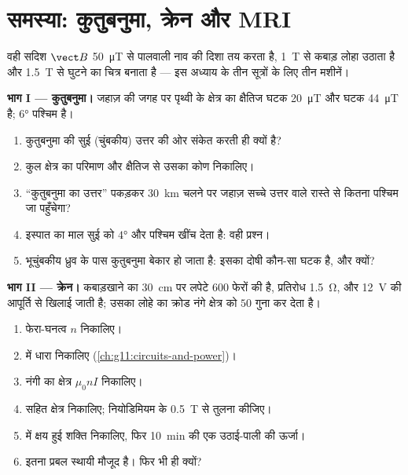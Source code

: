 \section{समस्या: कुतुबनुमा, क्रेन और MRI}

\begin{problem}
\label{pb:g11:magnetic-fields:1}
वही सदिश $\vect B$ \qty{50}{\micro T} से पालवाली नाव की दिशा तय करता है, \qty{1}{T} से
कबाड़ लोहा उठाता है और \qty{1.5}{T} से घुटने का चित्र बनाता है --- इस अध्याय के
तीन सूत्रों के लिए तीन मशीनें।

\medskip
\noindent\textbf{भाग I --- कुतुबनुमा।}
जहाज़ की जगह पर पृथ्वी के क्षेत्र का क्षैतिज घटक \qty{20}{\micro T} और
 घटक \qty{44}{\micro T} है;  $\ang{6}$ पश्चिम है।
\begin{enumerate}
  \item कुतुबनुमा की सुई (चुंबकीय) उत्तर की ओर संकेत करती ही क्यों है?
  \item कुल क्षेत्र का परिमाण और क्षैतिज से उसका कोण निकालिए।
  \item ``कुतुबनुमा का उत्तर'' पकड़कर \qty{30}{km} चलने पर जहाज़ सच्चे उत्तर वाले
        रास्ते से कितना पश्चिम जा पहुँचेगा?
  \item इस्पात का माल सुई को $\ang{4}$ और पश्चिम खींच देता है: वही प्रश्न।
  \item भूचुंबकीय ध्रुव के पास कुतुबनुमा बेकार हो जाता है: इसका दोषी कौन-सा
        घटक है, और क्यों?
\end{enumerate}

\medskip
\noindent\textbf{भाग II --- क्रेन।}
कबाड़खाने का  \qty{30}{cm} पर लपेटे $600$ फेरों की
 है, प्रतिरोध \qty{1.5}{\ohm}, और \qty{12}{V} की आपूर्ति से
खिलाई जाती है; उसका लोहे का क्रोड नंगे क्षेत्र को $50$ गुना कर
देता है।
\begin{enumerate}[resume]
  \item फेरा-घनत्व $n$ निकालिए।
  \item {} में धारा निकालिए (\cref{ch:g11:circuits-and-power})।
  \item नंगी  का क्षेत्र $\mu_0 n I$ निकालिए।
  \item {} सहित क्षेत्र निकालिए; नियोडिमियम के \qty{0.5}{T} से तुलना
        कीजिए।
  \item {} में क्षय हुई शक्ति निकालिए, फिर \qty{10}{\minute} की
        एक उठाई-पाली की ऊर्जा।
  \item इतना प्रबल स्थायी  मौजूद है। फिर भी
         ही क्यों?
\end{enumerate}


\end{problem}
